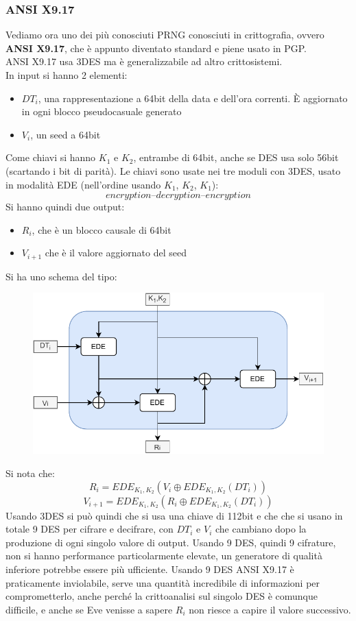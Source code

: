 \documentclass[a4paper,12pt, oneside]{book}
\begin{document}
\subsubsection{ANSI X9.17}
Vediamo ora uno dei più conosciuti PRNG conosciuti in crittografia, ovvero
\textbf{ANSI X9.17}, che è appunto diventato standard e piene usato in PGP.\\
ANSI X9.17 usa 3DES ma è generalizzabile ad altro crittosistemi.\\
In input si hanno 2 elementi:
\begin{itemize}
  \item $DT_i$, una rappresentazione a 64bit della data e dell'ora correnti. È
  aggiornato in ogni blocco pseudocasuale generato 
  \item $V_i$, un seed a 64bit
\end{itemize}
Come chiavi si hanno $K_1$ e $K_2$, entrambe di 64bit, anche se DES usa solo
56bit (scartando i bit di parità). Le chiavi sono usate nei 
tre moduli con 3DES, usato in modalità EDE (nell'ordine usando $K_1$, $K_2$,
$K_1$): 
\[encryption – decryption – encryption\]
\newpage
Si hanno quindi due output:
\begin{itemize}
  \item $R_i$, che è un blocco causale di 64bit
  \item $V_{i+1}$ che è il valore aggiornato del seed
\end{itemize}
Si ha uno schema del tipo:
\begin{figure}[H]
  \centering
  \includegraphics[scale = 0.9]{img/ansi.pdf}
\end{figure}
Si nota che:
\[R_i=EDE_{K_1,K_2}(V_i\oplus EDE_{K_1,K_2}(DT_i))\]
\[V_{i+1}=EDE_{K_1,K_2}(R_i\oplus EDE_{K_1,K_2}(DT_i))\]
Usando 3DES si può quindi che si usa una chiave di 112bit e che che si usano in
totale 9 DES per cifrare e decifrare, con $DT_i$ e $V_i$ che cambiano dopo la
produzione di ogni singolo valore di output. Usando 9 DES, quindi 9 cifrature,
non si hanno performance particolarmente elevate, un generatore di qualità
inferiore potrebbe essere più ufficiente. Usando 9 DES ANSI X9.17 è praticamente
inviolabile, serve una quantità incredibile di informazioni per comprometterlo,
anche perché la crittoanalisi sul singolo DES è comunque difficile, e
anche se Eve venisse a sapere $R_i$ non riesce a capire il valore successivo. 
\end{document}
